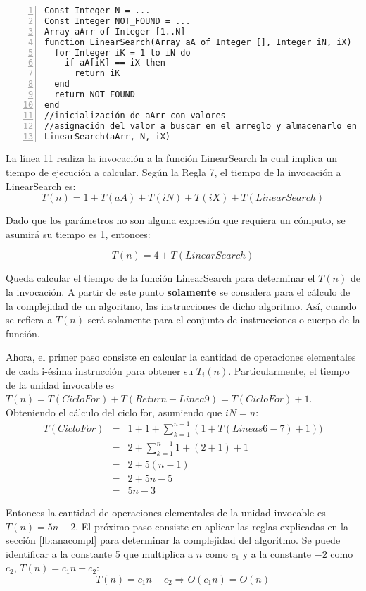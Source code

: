 \begin{lstlisting}[upquote=true, language=pseudo, numbers=left]
Const Integer N = ...
Const Integer NOT_FOUND = ...
Array aArr of Integer [1..N]
function LinearSearch(Array aA of Integer [], Integer iN, iX)	//iX es el elemento a buscar
  for Integer iK = 1 to iN do
    if aA[iK] == iX then
      return iK
  end
  return NOT_FOUND
end
//inicialización de aArr con valores
//asignación del valor a buscar en el arreglo y almacenarlo en iX
LinearSearch(aArr, N, iX)
\end{lstlisting}

La línea 11 realiza la invocación a la función LinearSearch la cual implica un tiempo de ejecución a calcular. Según la Regla 7, el tiempo de la invocación a LinearSearch es:
$$T(n) = 1 + T(aA) + T(iN) + T(iX) + T(LinearSearch)$$

Dado que los parámetros no son alguna expresión que requiera un cómputo, se asumirá su tiempo es 1, entonces:

$$T(n) = 4 + T(LinearSearch)$$

Queda calcular el tiempo de la función LinearSearch para determinar el $T(n)$ de la invocación. A partir de este punto \textbf{solamente} se considera para el cálculo de la complejidad de un algoritmo, las instrucciones de dicho algoritmo. Así, cuando se refiera a $T(n)$ será solamente para el conjunto de instrucciones o cuerpo de la función.

Ahora, el primer paso consiste en calcular la cantidad de operaciones elementales de cada i-ésima instrucción para obtener su $T_i(n)$. Particularmente, el tiempo de la unidad invocable es $T(n) = T(CicloFor) + T(Return-Linea9) = T(CicloFor) + 1$. Obteniendo el cálculo del ciclo for, asumiendo que $iN=n$:
\begin{eqnarray*}
T(CicloFor)&=&1 + 1 + \sum_{k=1}^{n - 1}{(1 + T(Lineas 6-7) + 1))}\\
&=&2 + \sum_{k=1}^{n - 1}{1 + (2 + 1) + 1}\\
&=&2 + 5(n - 1)\\
&=&2 + 5n - 5\\
&=&5n - 3
\end{eqnarray*}

Entonces la cantidad de operaciones elementales de la unidad invocable es $T(n) = 5n - 2$. El próximo paso consiste en aplicar las reglas explicadas en la sección \ref{lb:anacompl} para determinar la complejidad del algoritmo. Se puede identificar a la constante 5 que multiplica a $n$ como $c_1$ y a la constante $-2$ como $c_2$, $T(n) = c_1n + c_2$:
$$T(n) = c_1n + c_2 \Rightarrow O(c_1n) = O(n)$$

